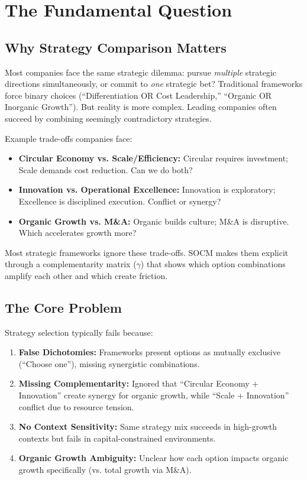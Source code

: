 \section{The Fundamental Question}
\label{sec:socm-fundamental}

\subsection{Why Strategy Comparison Matters}

Most companies face the same strategic dilemma: pursue \textit{multiple} strategic directions simultaneously, or commit to \textit{one} strategic bet? Traditional frameworks force binary choices (``Differentiation OR Cost Leadership,'' ``Organic OR Inorganic Growth''). But reality is more complex. Leading companies often succeed by combining seemingly contradictory strategies.

Example trade-offs companies face:
\begin{itemize}
    \item \textbf{Circular Economy vs. Scale/Efficiency:} Circular requires investment; Scale demands cost reduction. Can we do both?
    \item \textbf{Innovation vs. Operational Excellence:} Innovation is exploratory; Excellence is disciplined execution. Conflict or synergy?
    \item \textbf{Organic Growth vs. M\&A:} Organic builds culture; M\&A is disruptive. Which accelerates growth more?
\end{itemize}

Most strategic frameworks ignore these trade-offs. SOCM makes them explicit through a complementarity matrix ($\gamma$) that shows which option combinations amplify each other and which create friction.

\subsection{The Core Problem}

Strategy selection typically fails because:

\begin{enumerate}
    \item \textbf{False Dichotomies:} Frameworks present options as mutually exclusive (``Choose one''), missing synergistic combinations.

    \item \textbf{Missing Complementarity:} Ignored that ``Circular Economy + Innovation'' create synergy for organic growth, while ``Scale + Innovation'' conflict due to resource tension.

    \item \textbf{No Context Sensitivity:} Same strategy mix succeeds in high-growth contexts but fails in capital-constrained environments.

    \item \textbf{Organic Growth Ambiguity:} Unclear how each option impacts organic growth specifically (vs. total growth via M\&A).
\end{enumerate}

